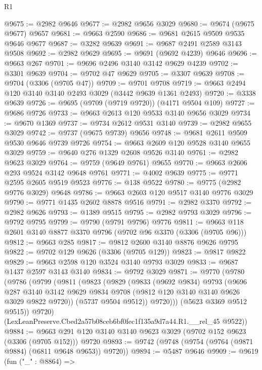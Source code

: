 \begin{lexlean}{R1}
\begin{coremodule}
@9675 := @2982 @9646
@9677 := @2982 @9656 @3029
@9680 := @9674 (@9675 @9677) @9657
@9681 := @9663 @2590
@9686 := @9681 @2615 @9509 @9535 @9646 @9677
@9687 := @3282 @9639
@9691 := @9687 @2491 @2589 @3143 @9508
@9692 := @2982 @9629
@9695 := @9691 (@9692 @4239) @9646
@9696 := @9663 @267
@9701 := @9696 @2496 @3140 @3142 @9629 @4239
@9702 := @3301 @9639
@9704 := @9702 @47 @9629
@9705 := @3307 @9639
@9708 := @9704 (@3306 (@9705 @47))
@9709 := @9701 @9708
@9719 := @9663 @2494 @120 @3140 @3140 @2493 @3029 (@3442 @9639 @1361 @2493)
@9720 := @3338 @9639
@9726 := @9695 (@9709 (@9719 @9720)) (@4171 @9504 @109)
@9727 := @9686 @9726
@9733 := @9663 @2613 @120 @9533 @3140 @9656 @3029
@9734 := @9670 @1369
@9737 := @9734 @2612 @9531 @3140
@9739 := @2982 @9655 @3029
@9742 := @9737 (@9675 @9739) @9656
@9748 := @9681 @2611 @9509 @9530 @9646 @9739 @9726
@9754 := @9663 @2609 @120 @9528 @3140 @9655 @3029
@9759 := @9640 @276 @1329 @2608 @9526 @3140
@9761 := @2982 @9623 @3029
@9764 := @9759 (@9649 @9761) @9655
@9770 := @9663 @2606 @293 @9524 @3142 @9648 @9761
@9771 := @4002 @9639
@9775 := @9771 @2595 @2605 @9519 @9523
@9776 := @138 @9522
@9780 := @9775 (@2982 @9776 @3029) @9648
@9786 := @9663 @2603 @120 @9517 @3140 @9776 @3029
@9790 := @9771 @1435 @2602 @8878 @9516
@9791 := @2982 @3370
@9792 := @2982 @9626
@9793 := @1389 @9515
@9795 := @2982 @9793 @3029
@9796 := @9792 @9795
@9799 := @9790 (@9791 @9796) @9776
@9811 := @9663 @118 @2601 @3140 @8877 @3370 @9796 (@9702 @96 @3370 (@3306 (@9705 @96)))
@9812 := @9663 @285
@9817 := @9812 @2600 @3140 @8876 @9626 @9795
@9822 := @9702 @129 @9626 (@3306 (@9705 @129))
@9823 := @9817 @9822
@9829 := @9663 @2598 @120 @3524 @3140 @9793 @3029
@9833 := @9687 @1437 @2597 @3143 @3140
@9834 := @9792 @3029
@9871 := @9770
    (@9780
      (@9786
        (@9799
          (@9811
            (@9823
              (@9829
                (@9833
                  (@9692 @9834)
                  @9793
                  (@9696
                    @287
                    @3140
                    @3142
                    @9629
                    @9834
                    @9708
                    (@9812 @120 @3140 @3140 @9626 @3029 @9822 @9720))
                  (@5737 @9504 @9512))
                @9720)))
          (@5623 @3369 @9512 @9515))
        @9720)
      (LexLeanPreserve.Cbed2a57b08ceb6bf0fec1f135a9d7a44.R1.__rel_45 @9522))
@9884 := @9663 @291 @120 @3140 @3140 @9623 @3029 (@9702 @152 @9623 (@3306 (@9705 @152))) @9720
@9893 := @9742 (@9748 (@9754 (@9764 (@9871 @9884) (@6811 @9648 @9653)) @9720))
@9894 := @5487 @9646
@9909 := @9619
    (fun ("_" : @8864) =>

\end{coremodule}
\end{lexlean}
